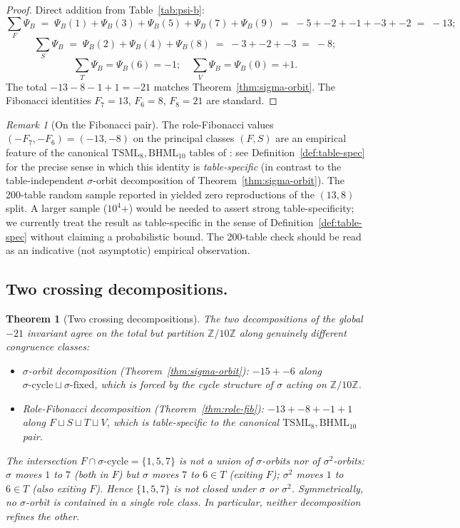 \documentclass[11pt,reqno]{amsart}
\theoremstyle{plain}
\newtheorem{theorem}{Theorem}[section]
\theoremstyle{definition}
\theoremstyle{remark}
\newtheorem*{remark}{Remark}
\newcommand{\Z}{\mathbb{Z}}
\newcommand{\TS}{\mathrm{TSML}}
\newcommand{\BH}{\mathrm{BHML}}
\newcommand{\sig}{\sigma}
\begin{document}
\begin{proof}
Direct addition from Table~\ref{tab:psi-b}:
\[
\sum_F \Psi_B
\;=\; \Psi_B(1) + \Psi_B(3) + \Psi_B(5) + \Psi_B(7) + \Psi_B(9)
\;=\; -5 + -2 + -1 + -3 + -2 \;=\; -13;
\]
\[
\sum_S \Psi_B
\;=\; \Psi_B(2) + \Psi_B(4) + \Psi_B(8)
\;=\; -3 + -2 + -3 \;=\; -8;
\]
\[
\sum_T \Psi_B = \Psi_B(6) = -1;
\quad
\sum_V \Psi_B = \Psi_B(0) = +1.
\]
The total $-13 - 8 - 1 + 1 = -21$ matches Theorem~\ref{thm:sigma-orbit}.
The Fibonacci identities $F_7 = 13$, $F_6 = 8$, $F_8 = 21$ are
standard.
\end{proof}

\begin{remark}[On the Fibonacci pair]
The role-Fibonacci values $(-F_7, -F_6) = (-13, -8)$ on the principal
classes $(F, S)$ are an empirical feature of the canonical
$\TS_{8}, \BH_{10}$ tables of \cite{SandersGishFourCore}: see
Definition~\ref{def:table-spec} for the precise sense in which this
identity is \emph{table-specific} (in contrast to the
table-independent $\sig$-orbit decomposition of
Theorem~\ref{thm:sigma-orbit}).
The 200-table random sample reported in
\cite[N8]{SandersBridgeWP9} yielded zero reproductions of the
$(13, 8)$ split. A larger sample ($10^{4}$+) would be needed to
assert strong table-specificity; we currently treat the result as
table-specific in the sense of Definition~\ref{def:table-spec}
without claiming a probabilistic bound. The 200-table check should
be read as an indicative (not asymptotic) empirical observation.
\end{remark}

\subsection{Two crossing decompositions.}
\begin{theorem}[Two crossing decompositions]\label{thm:cross}
The two decompositions of the global $-21$ invariant agree on the total
but partition $\Z/10\Z$ along genuinely different congruence classes:
\begin{itemize}
\item $\sig$-orbit decomposition (Theorem~\ref{thm:sigma-orbit}):
$-15 + -6$ along $\sig\text{-cycle} \sqcup \sig\text{-fixed}$,
which is forced by the cycle structure of $\sig$ acting on $\Z/10\Z$.
\item Role-Fibonacci decomposition (Theorem~\ref{thm:role-fib}):
$-13 + -8 + -1 + 1$ along $F \sqcup S \sqcup T \sqcup V$,
which is table-specific to the canonical $\TS_{8}, \BH_{10}$ pair.
\end{itemize}
The intersection $F \cap \sig\text{-cycle} = \{1, 5, 7\}$ is not a
union of $\sig$-orbits nor of $\sig^{2}$-orbits: $\sig$ moves $1$ to
$7$ (both in $F$) but $\sig$ moves $7$ to $6 \in T$ (exiting $F$);
$\sig^{2}$ moves $1$ to $6 \in T$ (also exiting $F$).
Hence $\{1, 5, 7\}$ is not closed under $\sig$ or $\sig^{2}$.
Symmetrically, no $\sig$-orbit is contained in a single role class.
In particular, neither decomposition refines the other.
\end{theorem}
\end{document}
